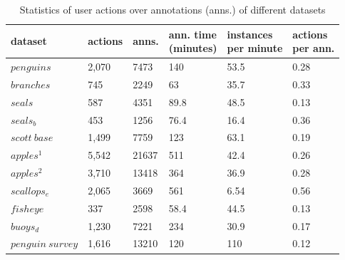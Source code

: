 \begin{table}[]
\centering
\caption{ Statistics of user actions over annotations (anns.) of different datasets }
\label{tab:annotation_table}
\begin{adjustbox}{max width=\textwidth}
\begin{tabular}{llllll}
dataset           & actions & anns. & \shortstack {ann. time \\ (minutes)} & \shortstack{instances \\ per minute} & \shortstack{actions \\ per ann.} \\
\toprule
$penguins$        & 2,070   & 7473        & 140                       & 53.5                 & 0.28                   \\
$branches$        & 745     & 2249        & 63                        & 35.7                 & 0.33                   \\
$seals$           & 587     & 4351        & 89.8                      & 48.5                 & 0.13                   \\
$seals_b$         & 453     & 1256        & 76.4                      & 16.4                 & 0.36                   \\
$scott\:base$     & 1,499   & 7759        & 123                       & 63.1                 & 0.19                   \\
$apples^1$        & 5,542   & 21637       & 511                       & 42.4                 & 0.26                   \\
$apples^2$        & 3,710   & 13418       & 364                       & 36.9                 & 0.28                   \\
$scallops_e$      & 2,065   & 3669        & 561                       & 6.54                 & 0.56                   \\
$fisheye$         & 337     & 2598        & 58.4                      & 44.5                 & 0.13                   \\
$buoys_d$         & 1,230   & 7221        & 234                       & 30.9                 & 0.17                   \\
$penguin\:survey$ & 1,616   & 13210       & 120                       & 110                  & 0.12                  \\
\bottomrule
\end{tabular}
\end{adjustbox}
\end{table}



